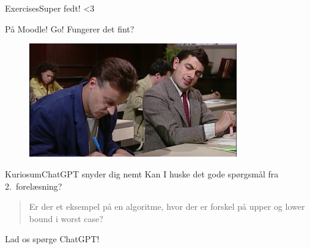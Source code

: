 \documentclass[aspectratio=1610]{beamer}
\begin{document}
\begin{frame}{Exercises}{Super fedt! <3}

    På Moodle! Go! Fungerer det fint?

    \begin{figure}[h]
        \centering
        \includegraphics[width=0.8\textwidth]{exercises}
    \end{figure}
    
\end{frame}

\begin{frame}{Kuriosum}{ChatGPT snyder dig nemt}
    Kan I huske det gode spørgsmål fra 2.\ forelæsning?
    \vfill

    \pause
    \begin{quote}
        Er der et eksempel på en algoritme, hvor der er forskel på upper og
        lower bound i worst case?
    \end{quote}

    \vfill
    \pause
    Lad os spørge ChatGPT!
\end{frame}
\end{document}
